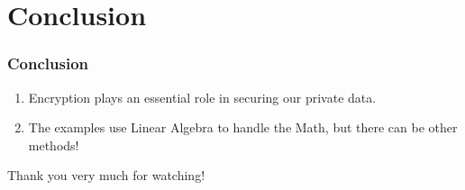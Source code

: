 \documentclass[11pt]{beamer}
\begin{document}
\section{Conclusion}
\begin{frame}\frametitle{Conclusion}
	\begin{enumerate}[]
	\item Encryption plays an essential role in securing our private data.
	\item The examples use Linear Algebra to handle the Math, but there can be other methods!
	\end{enumerate}
\end{frame}

\begin{frame}
	\center Thank you very much for watching!
\end{frame}
\end{document}
